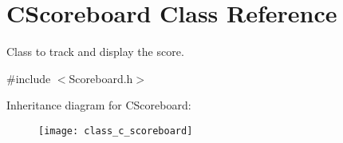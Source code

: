 \hypertarget{class_c_scoreboard}{}\section{C\+Scoreboard Class Reference}
\label{class_c_scoreboard}


Class to track and display the score.  




{\ttfamily \#include $<$Scoreboard.\+h$>$}

Inheritance diagram for C\+Scoreboard\+:\begin{figure}[H]
\begin{center}
\leavevmode
\texttt{[image: class\_c\_scoreboard]}
\end{center}
\end{figure}
